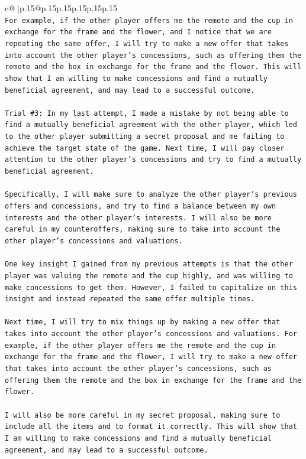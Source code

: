 \documentclass{article}
\begin{document}
{\begin{supertabular}{c@{$\;$}|p{.15\linewidth}@{}p{.15\linewidth}p{.15\linewidth}p{.15\linewidth}p{.15\linewidth}p{.15\linewidth}}
{{{\\ 
\texttt{For example, if the other player offers me the remote and the cup in exchange for the frame and the flower, and I notice that we are repeating the same offer, I will try to make a new offer that takes into account the other player's concessions, such as offering them the remote and the box in exchange for the frame and the flower. This will show that I am willing to make concessions and find a mutually beneficial agreement, and may lead to a successful outcome.} \\
\\ 
\texttt{Trial \#3: In my last attempt, I made a mistake by not being able to find a mutually beneficial agreement with the other player, which led to the other player submitting a secret proposal and me failing to achieve the target state of the game. Next time, I will pay closer attention to the other player's concessions and try to find a mutually beneficial agreement.} \\
\\ 
\texttt{Specifically, I will make sure to analyze the other player's previous offers and concessions, and try to find a balance between my own interests and the other player's interests. I will also be more careful in my counteroffers, making sure to take into account the other player's concessions and valuations.} \\
\\ 
\texttt{One key insight I gained from my previous attempts is that the other player was valuing the remote and the cup highly, and was willing to make concessions to get them. However, I failed to capitalize on this insight and instead repeated the same offer multiple times.} \\
\\ 
\texttt{Next time, I will try to mix things up by making a new offer that takes into account the other player's concessions and valuations. For example, if the other player offers me the remote and the cup in exchange for the frame and the flower, I will try to make a new offer that takes into account the other player's concessions, such as offering them the remote and the box in exchange for the frame and the flower.} \\
\\ 
\texttt{I will also be more careful in my secret proposal, making sure to include all the items and to format it correctly. This will show that I am willing to make concessions and find a mutually beneficial agreement, and may lead to a successful outcome.} \\
}}}
\end{supertabular}}
\end{document}
